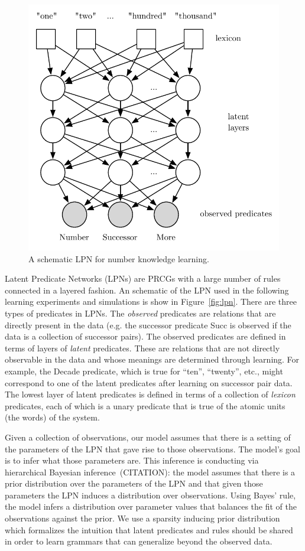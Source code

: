 \documentclass[10pt,letterpaper]{article}
\begin{document}
\begin{figure}[t]
  \begin{centering}
    \includegraphics[width=0.9\linewidth]{figures/lpn}
    \caption{A schematic LPN for number knowledge learning.}
  \end{centering}
\end{figure}

Latent Predicate Networks (LPNs) are PRCGs with a large number of
rules connected in a layered fashion. An schematic of the LPN used in
the following learning experiments and simulations is show in
Figure~\ref{fig:lpn}. There are three types of predicates in LPNs. The
\emph{observed} predicates are relations that are directly present in
the data (e.g. the successor predicate Succ is observed if the data is
a collection of successor pairs). The observed predicates are defined
in terms of layers of \emph{latent} predicates. These are relations
that are not directly observable in the data and whose meanings are
determined through learning. For example, the Decade predicate, which
is true for ``ten'', ``twenty'', etc., might correspond to one of the
latent predicates after learning on successor pair data. The lowest
layer of latent predicates is defined in terms of a collection of
\emph{lexicon} predicates, each of which is a unary predicate that is
true of the atomic units (the words) of the system.

Given a collection of observations, our model assumes that there is a
setting of the parameters of the LPN that gave rise to those
observations. The model's goal is to infer what those parameters
are. This inference is conducting via hierarchical Bayesian
inference~(CITATION): the model assumes that there is a prior
distribution over the parameters of the LPN and that given those
parameters the LPN induces a distribution over observations. Using
Bayes' rule, the model infers a distribution over parameter values
that balances the fit of the observations against the prior. We use a
sparsity inducing prior distribution which formalizes the intuition
that latent predicates and rules should be shared in order to learn
grammars that can generalize beyond the observed data.
\end{document}
